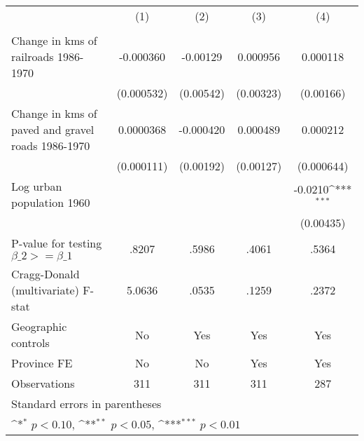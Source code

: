 {
\def\sym#1{\ifmmode^{#1}\else\(^{#1}\)\fi}
\begin{tabular}{l*{4}{c}}
\hline\hline
                &\multicolumn{1}{c}{(1)}&\multicolumn{1}{c}{(2)}&\multicolumn{1}{c}{(3)}&\multicolumn{1}{c}{(4)}\\
                &\multicolumn{1}{c}{}&\multicolumn{1}{c}{}&\multicolumn{1}{c}{}&\multicolumn{1}{c}{}\\
\hline
Change in kms of railroads 1986-1970&-0.000360         & -0.00129         & 0.000956         & 0.000118         \\
                &(0.000532)         &(0.00542)         &(0.00323)         &(0.00166)         \\
[1em]
Change in kms of paved and gravel roads 1986-1970&0.0000368         &-0.000420         & 0.000489         & 0.000212         \\
                &(0.000111)         &(0.00192)         &(0.00127)         &(0.000644)         \\
[1em]
Log urban population 1960&                  &                  &                  &  -0.0210\sym{***}\\
                &                  &                  &                  &(0.00435)         \\
\hline
P-value for testing $\beta\_{2} >= \beta\_{1}$&    .8207         &    .5986         &    .4061         &    .5364         \\
Cragg-Donald (multivariate) F-stat&   5.0636         &    .0535         &    .1259         &    .2372         \\
Geographic controls&       No         &      Yes         &      Yes         &      Yes         \\
Province FE     &       No         &       No         &      Yes         &      Yes         \\
Observations    &      311         &      311         &      311         &      287         \\
\hline\hline
\multicolumn{5}{l}{\footnotesize Standard errors in parentheses}\\
\multicolumn{5}{l}{\footnotesize \sym{*} \(p<0.10\), \sym{**} \(p<0.05\), \sym{***} \(p<0.01\)}\\
\end{tabular}
}
